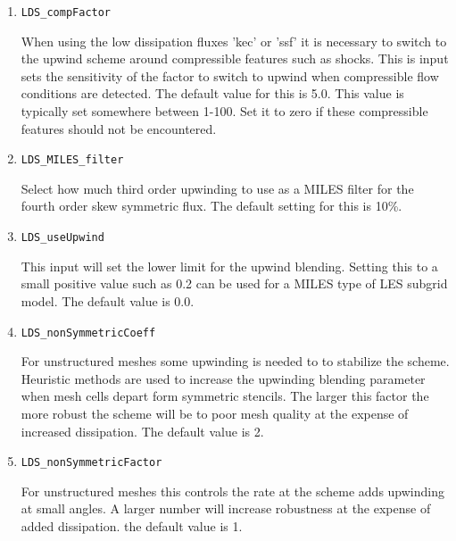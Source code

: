 \documentclass{article}
\begin{document}
\begin{enumerate}




\item {\tt LDS\_compFactor}

  When using the low dissipation fluxes 'kec' or 'ssf' it is necessary
  to switch to the upwind scheme around compressible features such as
  shocks.  This is input sets the sensitivity of the factor to switch
  to upwind when compressible flow conditions are detected.  The
  default value for this is 5.0.  This value is typically set
  somewhere between 1-100.  Set it to zero if these compressible
  features should not be encountered.

\item {\tt LDS\_MILES\_filter}

  Select how much third order upwinding to use as a MILES filter for the fourth order skew symmetric flux.  The default setting for this is 10\%.

\item {\tt LDS\_useUpwind}

  This input will set the lower limit for the upwind blending.
  Setting this to a small positive value such as 0.2 can be used for a
  MILES type of LES subgrid model.  The default value is 0.0.

\item {\tt LDS\_nonSymmetricCoeff}

  For unstructured meshes some upwinding is needed to to stabilize the
  scheme.  Heuristic methods are used to increase the upwinding
  blending parameter when mesh cells depart form symmetric stencils.
  The larger this factor the more robust the scheme will be to poor
  mesh quality at the expense of increased dissipation. The default
  value is 2.

\item {\tt LDS\_nonSymmetricFactor}

  For unstructured meshes this controls the rate at the scheme adds
  upwinding at small angles.  A larger number will increase robustness
  at the expense of added dissipation.  the default value is 1.


\end{enumerate}
\end{document}

